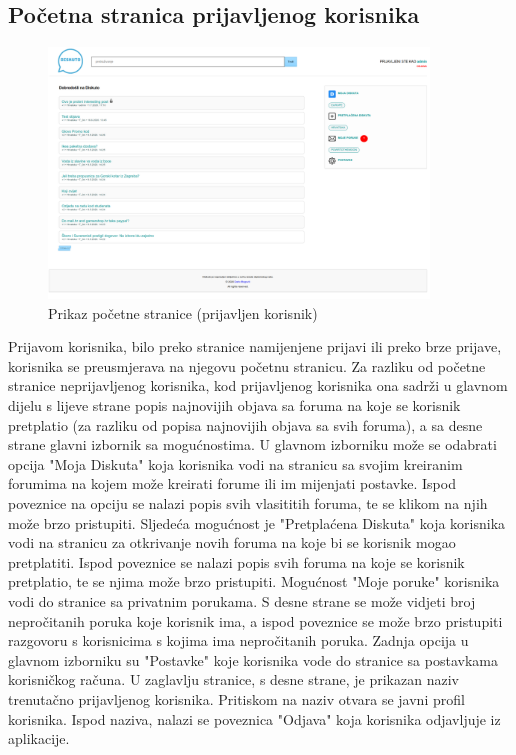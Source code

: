 \documentclass{foi}
\begin{document}
\subsection{Početna stranica prijavljenog korisnika}

\begin{figure}[h!]
    \centering
    \includegraphics[width=0.9\textwidth]{slike/pocetna-prijavljen.png}
    \caption{Prikaz početne stranice (prijavljen korisnik)}
\end{figure}

Prijavom korisnika, bilo preko stranice namijenjene prijavi ili preko brze prijave, korisnika se preusmjerava na njegovu početnu stranicu. Za razliku od početne stranice neprijavljenog korisnika, kod prijavljenog korisnika ona sadrži u glavnom dijelu s lijeve strane popis najnovijih objava sa foruma na koje se korisnik pretplatio (za razliku od popisa najnovijih objava sa svih foruma), a sa desne strane glavni izbornik sa mogućnostima. U glavnom izborniku može se odabrati opcija "Moja Diskuta" koja korisnika vodi na stranicu sa svojim kreiranim forumima na kojem može kreirati forume ili im mijenjati postavke. Ispod poveznice na opciju se nalazi popis svih vlasititih foruma, te se klikom na njih može brzo pristupiti. Sljedeća mogućnost je "Pretplaćena Diskuta" koja korisnika vodi na stranicu za otkrivanje novih foruma na koje bi se korisnik mogao pretplatiti. Ispod poveznice se nalazi popis svih foruma na koje se korisnik pretplatio, te se njima može brzo pristupiti. Mogućnost "Moje poruke" korisnika vodi do stranice sa privatnim porukama. S desne strane se može vidjeti broj nepročitanih poruka koje korisnik ima, a ispod poveznice se može brzo pristupiti razgovoru s korisnicima s kojima ima nepročitanih poruka. Zadnja opcija u glavnom izborniku su "Postavke" koje korisnika vode do stranice sa postavkama korisničkog računa. U zaglavlju stranice, s desne strane, je prikazan naziv trenutačno prijavljenog korisnika. Pritiskom na naziv otvara se javni profil korisnika. Ispod naziva, nalazi se poveznica "Odjava" koja korisnika odjavljuje iz aplikacije.
\end{document}
